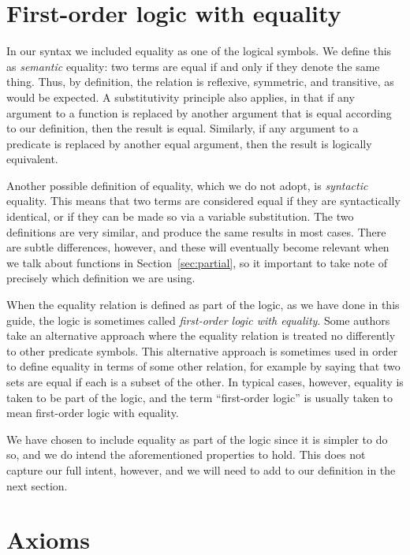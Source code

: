 \section{First-order logic with equality}
\label{sec:sem-equality}

In our syntax we included equality
as one of the logical symbols.
We define this as \emph{semantic} equality\label{gi:semantic-equality}:
two terms are equal if and only if they denote the same thing.
Thus, by definition, the relation is
reflexive, symmetric, and transitive,
as would be expected.
A substitutivity principle also applies,
in that if any argument to a function
is replaced by another argument that is equal according to our definition,
then the result is equal.
Similarly, if any argument to a predicate
is replaced by another equal argument,
then the result is logically equivalent.

Another possible definition of equality,
which we do not adopt,
is \emph{syntactic} equality.
This means that two terms are considered equal
if they are syntactically identical,
or if they can be made so via a variable substitution.
The two definitions are very similar,
and produce the same results in most cases.
There are subtle differences, however,
and these will eventually become relevant
when we talk about  functions
in Section~\ref{sec:partial},
so it important to take note of
precisely which definition we are using.

When the equality relation is defined as part of the logic,
as we have done in this guide,
the logic is sometimes called
\emph{first-order logic with equality}.
Some authors take an alternative approach where
the equality relation is treated
no differently to other predicate symbols.
This alternative approach is sometimes used in order to
define equality in terms of some other relation,
for example by saying that
two sets are equal if each is a subset of the other.
In typical cases, however,
equality is taken to be part of the logic,
and the term ``first-order logic''
is usually taken to mean first-order logic with equality.

We have chosen to include equality as part of the logic
since it is simpler to do so,
and we do intend the aforementioned properties to hold.
This does not capture our full intent, however,
and we will need to add to our definition in the next section.


\section{Axioms}
\label{sec:axioms}

